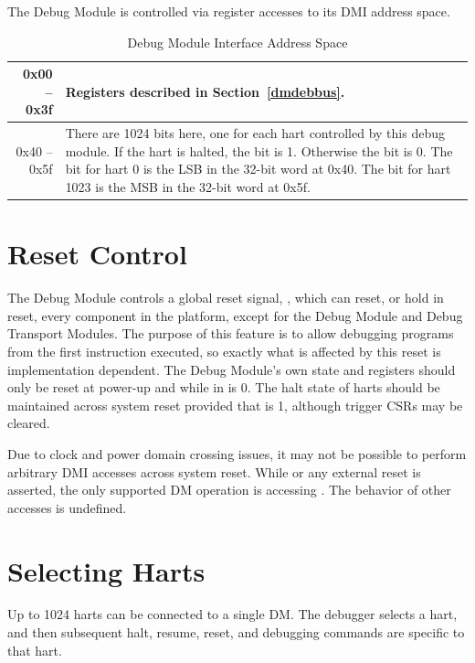 The Debug Module is controlled via register accesses to its DMI address space.

\begin{table}[htp]
    \centering
    \caption{Debug Module Interface Address Space}
    \label{tab:header}
    \begin{tabulary}{\textwidth}{|r|L|}
        \hline
        0x00 -- 0x3f & Registers described in Section~\ref{dmdebbus}. \\
        \hline
        0x40 -- 0x5f & There are 1024 bits here, one for each hart controlled
        by this debug module. If the hart is halted, the bit is 1.  Otherwise
        the bit is 0. The bit for hart 0 is the LSB in the 32-bit word at 0x40.
        The bit for hart 1023 is the MSB in the 32-bit word at 0x5f. \\
        \hline
    \end{tabulary}
\end{table}

\section{Reset Control} \label{reset}

The Debug Module controls a global reset signal, \Fndmreset,
which can reset, or hold in reset, every component in the platform,
except for the Debug Module and Debug
Transport Modules. The purpose of this feature is to allow debugging
programs from the first instruction executed, so exactly what is affected
by this reset is implementation dependent.
The Debug Module's own state and registers should only be
reset at power-up and while
\Fdmactive in \Rdmcontrol is 0.
The halt state of harts should be
maintained across system reset provided that \Fdmactive is 1,
although trigger CSRs may be cleared.

Due to clock and power domain crossing issues,
it may not be possible to perform arbitrary DMI accesses across
system reset.
While \Fndmreset or any external reset is asserted, the only supported DM
operation is accessing \Rdmcontrol. The behavior of other accesses is
undefined.

\section{Selecting Harts} \label{selectingharts}

Up to 1024 harts can be connected to a single DM. The debugger
selects a hart, and then subsequent halt, resume, reset, and debugging
commands are specific to that hart.

